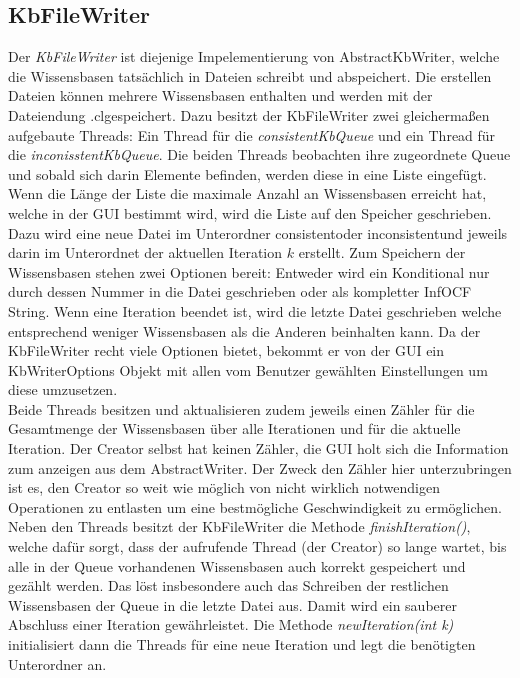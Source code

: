 \documentclass[12pt,a4paper]{article}
\begin{document}
\subsection{KbFileWriter}
\label{sec:kbfilewriter}
Der \textit{KbFileWriter} ist diejenige Impelementierung von AbstractKbWriter, welche die Wissensbasen tatsächlich in Dateien schreibt und abspeichert. Die erstellen Dateien können mehrere Wissensbasen enthalten und werden mit der Dateiendung \glqq .cl\grqq \space gespeichert. Dazu besitzt der KbFileWriter zwei gleichermaßen aufgebaute Threads: Ein Thread für die \textit{consistentKbQueue} und ein Thread für die \textit{inconisstentKbQueue}. Die beiden Threads beobachten ihre zugeordnete Queue und sobald sich darin Elemente befinden, werden diese in eine Liste eingefügt. Wenn die Länge der Liste die maximale Anzahl an Wissensbasen erreicht hat, welche in der GUI bestimmt wird, wird die Liste auf den Speicher geschrieben. Dazu wird eine neue  Datei im Unterordner \glqq consistent\grqq \space oder \glqq inconsistent\grqq \space  und jeweils darin im Unterordnet der aktuellen Iteration $k$ erstellt. Zum Speichern der Wissensbasen stehen zwei Optionen bereit: Entweder wird ein Konditional nur durch dessen Nummer in die Datei geschrieben oder als kompletter InfOCF String. Wenn eine Iteration beendet ist, wird die letzte Datei geschrieben welche entsprechend weniger Wissensbasen als die Anderen beinhalten kann. Da der KbFileWriter recht viele Optionen bietet, bekommt er von der GUI ein KbWriterOptions Objekt mit allen vom Benutzer gewählten Einstellungen um diese umzusetzen.\\
Beide Threads besitzen und aktualisieren zudem jeweils einen Zähler für die Gesamtmenge der Wissensbasen über alle Iterationen und für die aktuelle Iteration. Der Creator selbst hat keinen Zähler, die GUI holt sich die Information zum anzeigen aus dem AbstractWriter. Der Zweck den Zähler hier unterzubringen ist es, den Creator so weit wie möglich von nicht wirklich notwendigen Operationen zu entlasten um eine bestmögliche Geschwindigkeit zu ermöglichen.\\
Neben den Threads besitzt der KbFileWriter die Methode \textit{finishIteration()}, welche dafür sorgt, dass der aufrufende Thread (der Creator) so lange wartet, bis alle in der Queue vorhandenen Wissensbasen auch korrekt gespeichert und gezählt werden. Das löst insbesondere auch das Schreiben der restlichen Wissensbasen der Queue in die letzte Datei aus. Damit wird ein sauberer Abschluss einer Iteration gewährleistet. Die Methode \textit{newIteration(int k)} initialisiert dann die Threads für eine neue Iteration und legt die benötigten Unterordner an. \\
\end{document}
